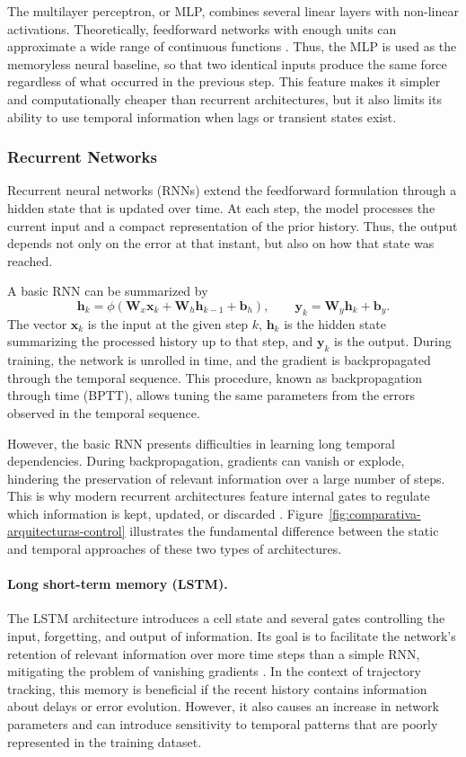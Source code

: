 The multilayer perceptron, or MLP, combines several linear layers with non-linear activations. Theoretically, feedforward networks with enough units can approximate a wide range of continuous functions \cite{cybenko1989approximation}. Thus, the MLP is used as the memoryless neural baseline, so that two identical inputs produce the same force regardless of what occurred in the previous step. This feature makes it simpler and computationally cheaper than recurrent architectures, but it also limits its ability to use temporal information when lags or transient states exist.

\subsubsection{Recurrent Networks}

Recurrent neural networks (RNNs) extend the feedforward formulation through a hidden state that is updated over time. At each step, the model processes the current input and a compact representation of the prior history. Thus, the output depends not only on the error at that instant, but also on how that state was reached.

A basic RNN can be summarized by
\[
  \bm{h}_k=\phi(\bm{W}_x\bm{x}_k+\bm{W}_h\bm{h}_{k-1}+\bm{b}_h),\qquad
  \bm{y}_k=\bm{W}_y\bm{h}_k+\bm{b}_y.
\]
The vector $\bm{x}_k$ is the input at the given step $k$, $\bm{h}_k$ is the hidden state summarizing the processed history up to that step, and $\bm{y}_k$ is the output. During training, the network is unrolled in time, and the gradient is backpropagated through the temporal sequence. This procedure, known as backpropagation through time (BPTT), allows tuning the same parameters from the errors observed in the temporal sequence.

However, the basic RNN presents difficulties in learning long temporal dependencies. During backpropagation, gradients can vanish or explode, hindering the preservation of relevant information over a large number of steps. This is why modern recurrent architectures feature internal gates to regulate which information is kept, updated, or discarded \cite{bengio1994longterm}. Figure~\ref{fig:comparativa-arquitecturas-control} illustrates the fundamental difference between the static and temporal approaches of these two types of architectures.

\paragraph*{Long short-term memory (LSTM).}
The LSTM architecture introduces a cell state and several gates controlling the input, forgetting, and output of information. Its goal is to facilitate the network's retention of relevant information over more time steps than a simple RNN, mitigating the problem of vanishing gradients \cite{hochreiter1997lstm}. In the context of trajectory tracking, this memory is beneficial if the recent history contains information about delays or error evolution. However, it also causes an increase in network parameters and can introduce sensitivity to temporal patterns that are poorly represented in the training dataset.

